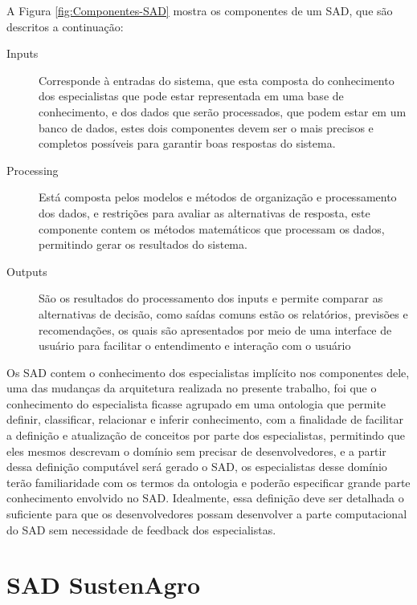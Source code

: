 A Figura \ref{fig:Componentes-SAD} mostra os componentes de um SAD\citet{Tweedale2016},
que são descritos a continuação: 
\begin{description}
\item [{I\foreignlanguage{english}{nputs}}] Corresponde à entradas do sistema,
que esta composta do conhecimento dos especialistas que pode estar
representada em uma base de conhecimento, e dos dados que serão processados,
que podem estar em um banco de dados, estes dois componentes devem
ser o mais precisos e completos possíveis para garantir boas respostas
do sistema.
%
\item [{Processing}] \foreignlanguage{brazil}{Está composta pelos modelos
e métodos de organização e processamento dos dados, e restrições para
avaliar as alternativas de resposta, este componente contem os métodos
matemáticos que processam os dados, permitindo gerar os resultados
do sistema.}
\item [{Outputs}] \foreignlanguage{brazil}{São os resultados do processamento
dos inputs e permite comparar as alternativas de decisão, como saídas
comuns estão os relatórios, previsões e recomendações, os quais são
apresentados por meio de uma interface de usuário para facilitar o
entendimento e interação com o usuário}
\end{description}
Os SAD contem o conhecimento dos especialistas implícito nos componentes
dele, uma das mudanças da arquitetura realizada no presente trabalho,
foi que o conhecimento do especialista ficasse agrupado em uma ontologia
que permite definir, classificar, relacionar e inferir conhecimento,
com a finalidade de facilitar a definição e atualização de conceitos
por parte dos especialistas, permitindo que eles mesmos descrevam
o domínio sem precisar de desenvolvedores, e a partir dessa definição
computável será gerado o SAD, os especialistas desse domínio terão
familiaridade com os termos da ontologia e poderão especificar grande
parte conhecimento envolvido no SAD. Idealmente, essa definição deve
ser detalhada o suficiente para que os desenvolvedores possam desenvolver
a parte computacional do SAD sem necessidade de \foreignlanguage{english}{feedback}
dos especialistas.

\section{SAD SustenAgro}


